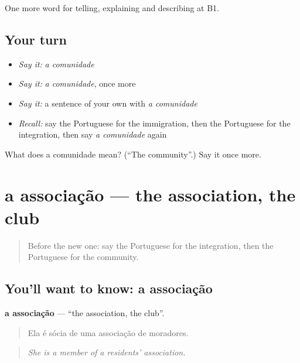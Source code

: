 \begin{grammarlens}[title={What you've built}]
One more word for telling, explaining and describing at B1.
\end{grammarlens}

\subsection*{Your turn}
\begin{itemize}
\raggedright
  \item \emph{Say it:} \emph{a comunidade}
  \item \emph{Say it:} \emph{a comunidade}, once more
  \item \emph{Say it:} a sentence of your own with \emph{a comunidade}
  \item \emph{Recall:} say the Portuguese for the immigration, then the Portuguese for the integration, then say \emph{a comunidade} again
\end{itemize}

\begin{tcolorbox}[breakable,colback=teal!4,colframe=teal!35!black,title={Before you move on}]
What does a comunidade mean? (\textquotedblleft{}The community\textquotedblright{}.) Say it once more.
\end{tcolorbox}
\section[a associação]{a associação — the association, the club}

\label{lesson:PT-C367-associacao}



\begin{quote}
Before the new one: say the Portuguese for the integration, then the Portuguese for the community.
\end{quote}

\subsection*{You'll want to know: a associação}
\textbf{a associação} — \textquotedblleft{}the association, the club\textquotedblright{}.

\begin{quote}
Ela é sócia de uma associação de moradores.
\end{quote}

\begin{quote}
\emph{She is a member of a residents' association.}
\end{quote}

